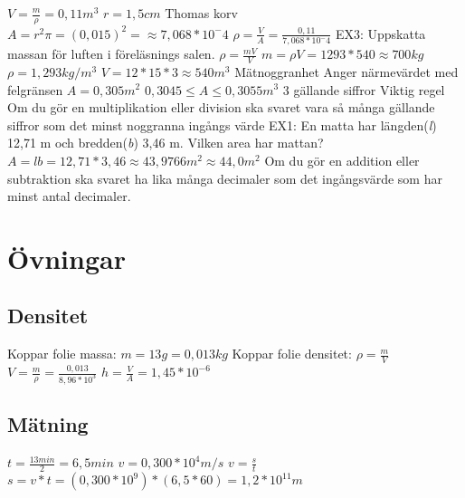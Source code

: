\documentclass[a4paper,11pt]{article}
\begin{document}
\begin{flushleft}
$ V= \frac{m}{\rho} = 0,11 m^3 $\newline
$ r = 1,5 cm $ Thomas korv\newline
$ A = r^2 \pi = (0,015)^2 =\approx 7,068*10^-4 $\newline
$ \rho = \frac{V}{A} = \frac{0,11}{7,068*10^-4} $\newline
\newpage
EX3:\newline
Uppskatta massan för luften i föreläsnings salen.\newline
$ \rho = \frac{m V}{V} $\newline
$ m = \rho V = 1293 * 540 \approx 700 kg $\newline
$ \rho = 1,293 kg/m^3 $\newline
$ V = 12 * 15 * 3  \approx 540 m^3 $
\newpage
Mätnoggranhet\newline
Anger närmevärdet med felgränsen\newline
$ A = 0,305 m^2 $\newline
$ 0,3045 \leqslant  A \leqslant  0,3055 m^3 $ 3 gällande siffror\newline
\newpage
Viktig regel\newline
Om du gör en multiplikation eller division ska svaret vara så många gällande siffror som det minst noggranna ingångs värde\newline
EX1:\newline
En matta har längden(\textit{l}) 12,71 m och bredden(\textit{b}) 3,46 m.\newline
Vilken area har mattan?\newline
$ A = lb = 12,71 * 3,46 \approx 43,9766 m^2 \approx 44,0 m^2 $\newline
Om du gör en addition eller subtraktion ska svaret ha lika många decimaler som det ingångsvärde som har minst antal decimaler.
\section{Övningar}
\subsection{Densitet}
Koppar folie massa: $m=13g=0,013kg $\newline
Koppar folie densitet: $ \rho=\frac{m}{V} $ $ V=\frac{m}{\rho} = \frac{0,013}{8,96*10^3} $\newline
$ h=\frac{V}{A}=1,45*10^{-6} $
\subsection{Mätning}
$ t=\frac{13min}{2}=6,5min $
$ v= 0,300*10^4 m/s $\newline
$ v=\frac{s}{t} $\newline
$ s=v*t = (0,300*10^9)*(6,5*60)=1,2*10^{11}m $

\end{flushleft}
\end{document}

